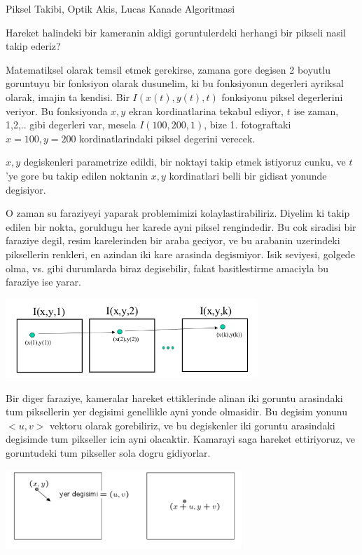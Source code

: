 \documentclass[12pt,fleqn]{article}
\begin{document}
Piksel Takibi, Optik Akis, Lucas Kanade Algoritmasi

Hareket halindeki bir kameranin aldigi goruntulerdeki herhangi bir pikseli
nasil takip ederiz? 

Matematiksel olarak temsil etmek gerekirse, zamana gore degisen 2 boyutlu
goruntuyu bir fonksiyon olarak dusunelim, ki bu fonksiyonun degerleri
ayriksal olarak, imajin ta kendisi. Bir $I(x(t),y(t),t)$ fonksiyonu piksel
degerlerini veriyor. Bu fonksiyonda $x,y$ ekran kordinatlarina tekabul
ediyor, $t$ ise zaman, 1,2,.. gibi degerleri var, mesela $I(100,200,1)$,
bize 1. fotograftaki $x=100,y=200$ kordinatlarindaki piksel degerini
verecek. 

$x,y$ degiskenleri parametrize edildi, bir noktayi takip etmek istiyoruz
cunku, ve $t$'ye gore bu takip edilen noktanin $x,y$ kordinatlari belli bir
gidisat yonunde degisiyor.

O zaman su faraziyeyi yaparak problemimizi kolaylastirabiliriz. Diyelim ki
takip edilen bir nokta, goruldugu her karede ayni piksel rengindedir. Bu
cok siradisi bir faraziye degil, resim karelerinden bir araba geciyor, ve
bu arabanin uzerindeki piksellerin renkleri, en azindan iki kare arasinda
degismiyor. Isik seviyesi, golgede olma, vs. gibi durumlarda biraz
degisebilir, fakat basitlestirme amaciyla bu faraziye ise yarar.

\includegraphics[height=3cm]{disp2.png}

Bir diger faraziye, kameralar hareket ettiklerinde alinan iki goruntu
arasindaki tum piksellerin yer degisimi genellikle ayni yonde olmasidir. Bu
degisim yonunu $<u,v>$ vektoru olarak gorebiliriz, ve bu degiskenler iki
goruntu arasindaki degisimde tum pikseller icin ayni olacaktir. Kamarayi
saga hareket ettiriyoruz, ve goruntudeki tum pikseller sola dogru
gidiyorlar. 

\includegraphics[height=3cm]{disp.png}
\end{document}
